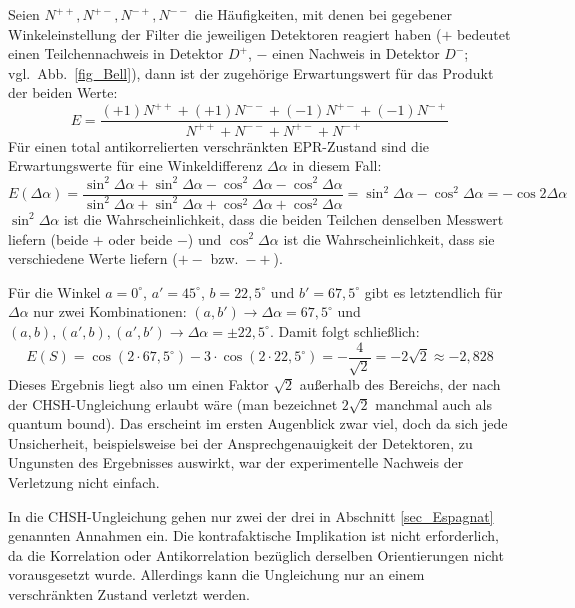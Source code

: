 Seien $N^{++}, N^{+-}, N^{-+},N^{--}$ die H\"aufigkeiten, 
mit denen bei gegebener Winkel\-einstellung
der Filter die jeweiligen Detektoren reagiert haben ($+$ bedeutet
einen Teilchennachweis in Detektor $D^+$, $-$ einen Nachweis
in Detektor $D^-$; vgl.\ Abb.\ \ref{fig_Bell}), dann ist der zugeh\"orige Erwartungswert
f\"ur das Produkt der beiden Werte:
\begin{equation}
       E = \frac{(+1)N^{++} + (+1)N^{--} + (-1) N^{+-} + (-1) N^{-+}}{N^{++} + 
              N^{--} + N^{+-} + N^{-+}}
\end{equation}
F\"ur einen
total antikorrelierten verschr\"ankten EPR-Zustand
sind die Erwartungswerte f\"ur eine Winkeldifferenz
$\Delta \alpha$ in diesem Fall:
\begin{equation}
     E(\Delta \alpha) 
     = \frac{ \sin^2 \Delta \alpha + \sin^2 \Delta \alpha - \cos^2 \Delta \alpha - \cos^2 \Delta \alpha}{ \sin^2 \Delta \alpha + \sin^2 \Delta \alpha + \cos^2 \Delta \alpha + \cos^2 \Delta \alpha} = 
     \sin^2 \Delta \alpha - \cos^2 \Delta \alpha
          = - \cos 2 \Delta \alpha
\end{equation}
$\sin^2 \Delta \alpha$ ist die Wahrscheinlichkeit, dass die
beiden Teilchen denselben Messwert liefern (beide $+$ oder
beide $-$) und $\cos^2 \Delta \alpha$ ist die Wahrscheinlichkeit,
dass sie verschiedene Werte liefern ($+-$ bzw.\ $-+$).

F\"ur die Winkel $a=0^\circ$, $a'=45^\circ$, $b=22,5^\circ$ und 
$b'=67,5^\circ$ gibt es letztendlich f\"ur $\Delta \alpha$ nur
zwei Kombinationen: $(a,b') \rightarrow \Delta \alpha = 67,5^\circ$
und $(a,b), (a',b), (a',b') \rightarrow \Delta \alpha = \pm 22,5^\circ$.
Damit folgt schlie\ss lich:
\begin{equation}    
    E(S) = \cos (2\cdot 67,5^\circ) - 3 \cdot \cos ( 2\cdot 22,5^\circ) =
      - \frac{4}{\sqrt{2}} = - 2 \sqrt{2} \approx - 2,828   
\end{equation}  
Dieses 
Ergebnis liegt also um einen Faktor $\sqrt{2}$ au\ss erhalb
des Bereichs, der nach der CHSH-Ungleichung erlaubt w\"are
(man bezeichnet $2\sqrt{2}$ manchmal auch als \glqq quantum bound\grqq).
Das erscheint im ersten Augenblick zwar viel, doch da sich
jede Unsicherheit, beispielsweise bei der Ansprechgenauigkeit
der Detektoren, zu Ungunsten des Ergebnisses auswirkt,
war der experimentelle Nachweis der Verletzung nicht einfach.

In die CHSH-Ungleichung gehen nur zwei der drei in Abschnitt
\ref{sec_Espagnat} genannten Annahmen ein. Die kontrafaktische Implikation
ist 
nicht erforderlich, da die Korrelation oder Antikorrelation
bez\"uglich derselben Orientierungen nicht vorausgesetzt
wurde. Allerdings kann die Ungleichung nur an einem
verschr\"ankten Zustand verletzt werden.

